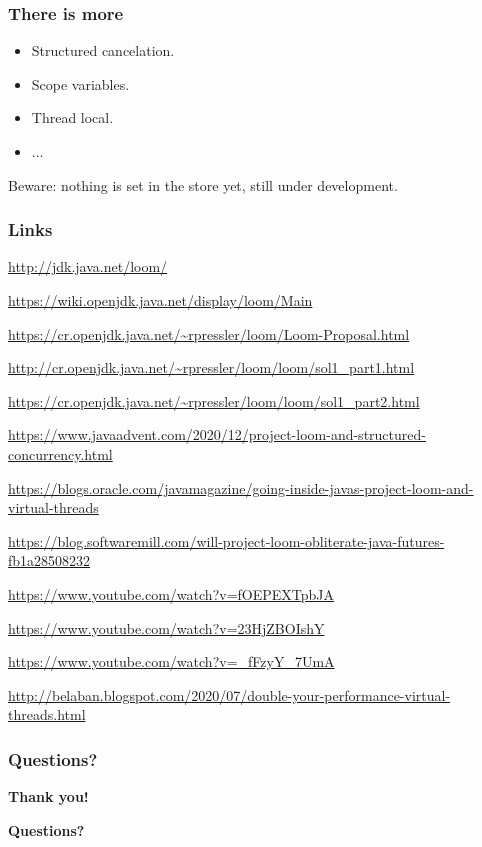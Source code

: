 \documentclass[10pt,utf8]{beamer}
\begin{document}
\begin{frame}
    \frametitle{There is more}
    \begin{itemize}
        \item Structured cancelation.
        \item Scope variables.
        \item Thread local.
        \item $\dots$
    \end{itemize}
    
    \vspace{1cm}
    
    Beware: nothing is set in the store yet, still under development.
\end{frame}

\begin{frame}
    \frametitle{Links}
    \begin{itemize}
    {\scriptsize
        \item \url{http://jdk.java.net/loom/}
        \item \url{https://wiki.openjdk.java.net/display/loom/Main}
        \item \url{https://cr.openjdk.java.net/~rpressler/loom/Loom-Proposal.html}
        \item \url{http://cr.openjdk.java.net/~rpressler/loom/loom/sol1_part1.html}
        \item \url{https://cr.openjdk.java.net/~rpressler/loom/loom/sol1_part2.html}
        \item \url{https://www.javaadvent.com/2020/12/project-loom-and-structured-concurrency.html}
        \item \url{https://blogs.oracle.com/javamagazine/going-inside-javas-project-loom-and-virtual-threads}
        \item \url{https://blog.softwaremill.com/will-project-loom-obliterate-java-futures-fb1a28508232}
        \item \url{https://www.youtube.com/watch?v=fOEPEXTpbJA}
        \item \url{https://www.youtube.com/watch?v=23HjZBOIshY}
        \item \url{https://www.youtube.com/watch?v=_fFzyY_7UmA}
        \item \url{http://belaban.blogspot.com/2020/07/double-your-performance-virtual-threads.html}
    }
    \end{itemize}
\end{frame}

\begin{frame}
    \frametitle{Questions?}
    \centering
     \textbf{\Huge{Thank you!}}
    
    \vspace{1.5cm}
    
    \textbf{\Huge{Questions?}}
    
    \vspace{1cm}
\end{frame}
\end{document}

